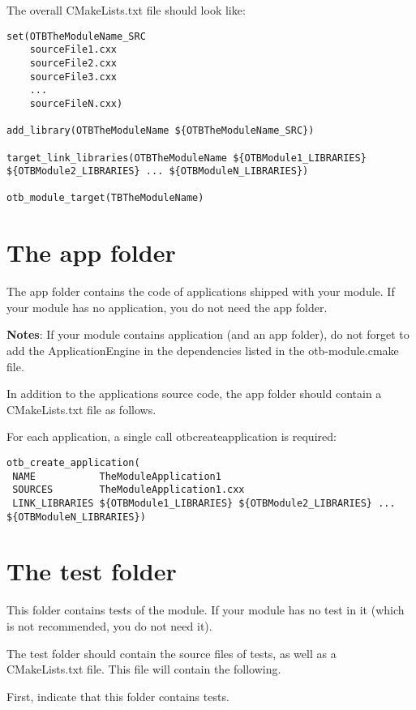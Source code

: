 The overall CMakeLists.txt file should look like:

\begin{verbatim}
set(OTBTheModuleName_SRC
    sourceFile1.cxx
    sourceFile2.cxx
    sourceFile3.cxx
    ...
    sourceFileN.cxx)

add_library(OTBTheModuleName ${OTBTheModuleName_SRC})

target_link_libraries(OTBTheModuleName ${OTBModule1_LIBRARIES} ${OTBModule2_LIBRARIES} ... ${OTBModuleN_LIBRARIES})

otb_module_target(TBTheModuleName)
\end{verbatim}

\section{The app folder}

The app folder contains the code of applications shipped with your module. If your module has no application, you do not need the app folder.

\textbf{Notes}: If your module contains application (and an app folder), do not forget to add the ApplicationEngine in the dependencies listed in the otb-module.cmake file.

In addition to the applications source code, the app folder should contain a CMakeLists.txt file as follows.

For each application, a single call otb\textunderscore create\textunderscore application is required:

\begin{verbatim}
otb_create_application(
 NAME           TheModuleApplication1
 SOURCES        TheModuleApplication1.cxx
 LINK_LIBRARIES ${OTBModule1_LIBRARIES} ${OTBModule2_LIBRARIES} ... ${OTBModuleN_LIBRARIES})

\end{verbatim}

\section{The test folder}

This folder contains tests of the module. If your module has no test in it (which is not recommended, you do not need it).

The test folder should contain the source files of tests, as well as a CMakeLists.txt file. This file will contain the following.

First, indicate that this folder contains tests.

